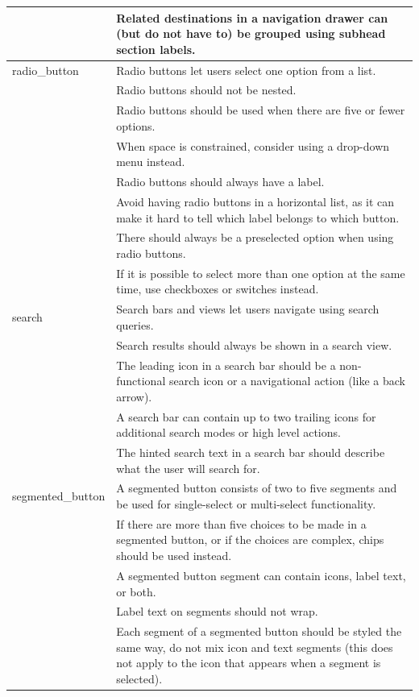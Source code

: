 \documentclass[11pt,titlepage,oneside,openany]{book}
\begin{document}
\begin{longtable}{|p{}|p{}|}
	~ & Related destinations in a navigation drawer can (but do not have to) be grouped using subhead section labels. \\ \hline
	radio\_button & Radio buttons let users select one option from a list. \\ 
	~ & Radio buttons should not be nested. \\ 
	~ & Radio buttons should be used when there are five or fewer options. \\ 
	~ & When space is constrained, consider using a drop-down menu instead. \\ 
	~ & Radio buttons should always have a label. \\ 
	~ & Avoid having radio buttons in a horizontal list, as it can make it hard to tell which label belongs to which button. \\ 
	~ & There should always be a preselected option when using radio buttons. \\ 
	~ & If it is possible to select more than one option at the same time, use checkboxes or switches instead. \\ \hline
	search & Search bars and views let users navigate using search queries. \\ 
	~ & Search results should always be shown in a search view. \\ 
	~ & The leading icon in a search bar should be a non-functional search icon or a navigational action (like a back arrow). \\ 
	~ & A search bar can contain up to two trailing icons for additional search modes or high level actions. \\ 
	~ & The hinted search text in a search bar should describe what the user will search for. \\ \hline
	segmented\_button & A segmented button consists of two to five segments and be used for single-select or multi-select functionality. \\ 
	~ & If there are more than five choices to be made in a segmented button, or if the choices are complex, chips should be used instead. \\ 
	~ & A segmented button segment can contain icons, label text, or both. \\ 
	~ & Label text on segments should not wrap. \\ 
	~ & Each segment of a segmented button should be styled the same way, do not mix icon and text segments (this does not apply to the icon that appears when a segment is selected). \\ \hline

\end{longtable}
\end{document}
